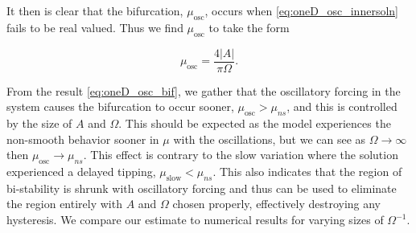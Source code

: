 It then is clear that the bifurcation, $\mu_{\text{osc}}$, occurs when \eqref{eq:oneD_osc_innersoln} fails to be real valued. Thus we find $\mu_{\text{osc}}$ to take the form

\begin{equation}\label{eq:oneD_osc_bif}
\mu_{\text{osc}}=\frac{4|A|}{\pi \Omega}.
\end{equation}

From the result \eqref{eq:oneD_osc_bif}, we gather that the oscillatory forcing in the system causes the bifurcation to occur sooner, $\mu_{\text{osc}}>\mu_{ns}$, and this is controlled by the size of $A$ and $\Omega$. This should be expected as the model experiences the non-smooth behavior sooner in $\mu$ with the oscillations, but we can see as $\Omega\to\infty$ then $\mu_{\text{osc}}\to\mu_{ns}$. This effect is contrary to the slow variation where the solution experienced a delayed tipping, $\mu_{\text{slow}}<\mu_{ns}$. This also indicates that the region of bi-stability is shrunk with oscillatory forcing and thus can be used to eliminate the region entirely with $A$ and $\Omega$ chosen properly, effectively destroying any hysteresis. We compare our estimate to numerical results for varying sizes of $\Omega^{-1}$.

